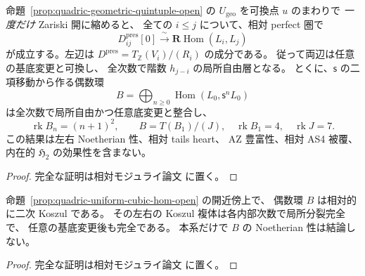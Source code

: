 \begin{proposition}
\label{prop:quadric-uniform-cubic-hom-open}
命題~\ref{prop:quadric-geometric-quintuple-open} の
$U_{\mathrm{geo}}$ を可換点 $u$ のまわりで
\emph{一度だけ} Zariski 開に縮めると、
全ての $i\le j$ について、相対 perfect 圏で
\[
 D^{\mathrm{pres}}_{ij}[0]
 \xrightarrow{\ \sim\ }
 \mathbf R\operatorname{Hom}(L_i,L_j)
 \tag{Geo-Hom}\label{eq:quadric-uniform-geometric-hom}
\]
が成立する。左辺は
$D^{\mathrm{pres}}=T_{\mathbb Z}(V_i)/(R_i)$ の成分である。
従って両辺は任意の基底変更と可換し、
全次数で階数 $h_{j-i}$ の局所自由層となる。
とくに、$\mathsf s$ の二項移動から作る偶数環
\[
 B=\bigoplus_{n\ge0}
   \operatorname{Hom}(L_0,\mathsf s^nL_0)
\]
は全次数で局所自由かつ任意底変更と整合し、
\[
 \operatorname{rk}B_n=(n+1)^2,\qquad
 B=T(B_1)/(J),\quad
 \operatorname{rk}B_1=4,\quad\operatorname{rk}J=7.
\]
この結果は左右 Noetherian 性、相対 tails heart、
AZ 豊富性、相対 AS4 被覆、内在的 $\mathfrak H_2$
の効果性を含まない。
\end{proposition}
\begin{proof}
完全な証明は相対モジュライ論文 \cite[\texttt{artin_roots}]{QuadricModuli2026} に置く。
\end{proof}


\begin{corollary}
\label{cor:quadric-uniform-even-koszul}
命題~\ref{prop:quadric-uniform-cubic-hom-open} の開近傍上で、
偶数環 $B$ は相対的に二次 Koszul である。
その左右の Koszul 複体は各内部次数で局所分裂完全で、
任意の基底変更後も完全である。
本系だけで $B$ の Noetherian 性は結論しない。
\end{corollary}
\begin{proof}
完全な証明は相対モジュライ論文 \cite[\texttt{artin_roots}]{QuadricModuli2026} に置く。
\end{proof}



